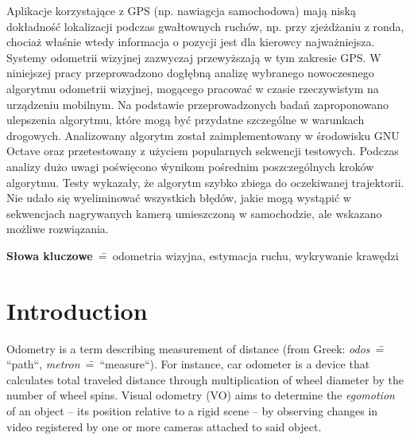Aplikacje korzystające z GPS (np. nawiagcja samochodowa) mają niską dokładno\'sć lokalizacji podczas gwałtownych ruchów, np. przy zjeżdżaniu z ronda, chociaż wła\'snie wtedy informacja o pozycji jest dla kierowcy najważniejsza.
Systemy odometrii wizyjnej zazwyczaj przewyższają w tym zakresie GPS.
W niniejszej pracy przeprowadzono dogłębną analizę wybranego nowoczesnego algorytmu odometrii wizyjnej, mogącego pracować w czasie rzeczywistym na urządzeniu mobilnym. Na podstawie przeprowadzonych badań zaproponowano ulepszenia algorytmu, które mogą być przydatne szczególne w warunkach drogowych.
Analizowany algorytm został zaimplementowany w \'srodowisku GNU Octave oraz przetestowany z użyciem popularnych sekwencji testowych. Podczas analizy dużo uwagi po\'swięcono \'wynikom pośrednim poszczególnych kroków algorytmu.
Testy wykazały, że algorytm szybko zbiega do oczekiwanej trajektorii. Nie udało się wyeliminować wszystkich błędów, jakie mogą wystąpić w sekwencjach nagrywanych kamerą umieszczoną w samochodzie, ale wskazano możliwe rozwiązania.

\textbf{S\l{}owa kluczowe}~\==~odometria wizyjna, estymacja ruchu, wykrywanie kraw\k{e}dzi

\newpage

\section*{Introduction}


Odometry is a term describing measurement of distance (from Greek: \textit{odos}~\==~ ``path``, \textit{metron}~\==~``measure``). For instance, car odometer is a device that calculates total traveled distance through multiplication of wheel diameter by the number of wheel spins. Visual odometry (VO) aims to determine the \textit{egomotion} of an object -- its position relative to a rigid scene -- by observing changes in video registered by one or more cameras attached to said object.

